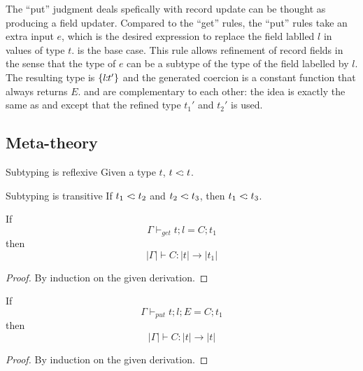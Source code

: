 \begin{itemize}
  The ``put'' judgment deals spefically with record update can be thought as
  producing a field updater. Compared to the ``get'' rules, the ``put'' rules
  take an extra input $ e $, which is the desired expression to replace the
  field lablled $ l $ in values of type $ t $.  is the base
  case. This rule allows refinement of record fields in the sense that the type
  of $ e $ can be a subtype of the type of the field labelled by $ l $. The
  resulting type is $ \{ l \!\!:\!\! t' \} $ and the generated coercion is a
  constant function that always returns $ E $.  and
   are complementary to each other: the idea is exactly the
  same as  and  except that the refined type
  $ t_1' $ and $ t_2' $ is used.

\end{itemize}

\subsection{Meta-theory}

\begin{lemma}{Subtyping is reflexive} \label{sub-refl}
Given a type $ t $, $ t <\!: t $.
\end{lemma}

\begin{lemma}{Subtyping is transitive} \label{sub-trans}
If $ t_1 <\!: t_2 $ and $ t_2 <\!: t_3$,
then $ t_1 <\!: t_3$.
\end{lemma}


\begin{lemma} \label{type-get}
  If $$ \Gamma \vdash_{get} t ; l = C ; t_1 $$
  then $$ |\Gamma| \vdash C : |t| \to |t_1| $$
\end{lemma}

\begin{proof}
By induction on the given derivation.
\end{proof}

\begin{lemma} \label{type-put}
  If $$ \Gamma \vdash_{put} t ; l ; E = C ; t_1 $$
  then $$ |\Gamma| \vdash C : |t| \to |t| $$
\end{lemma}

\begin{proof}
By induction on the given derivation.
\end{proof}

